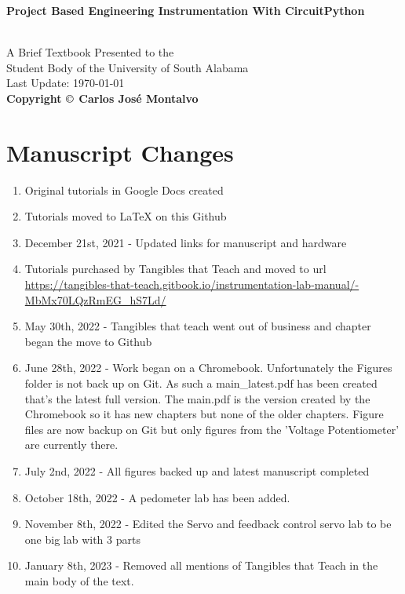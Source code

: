 \documentclass{article}
\begin{document}
\begin{center}
\begin{LARGE}{\bf Project Based Engineering Instrumentation With CircuitPython}\end{LARGE}\\
\large
\vspace{22 mm}
   A Brief Textbook Presented to the \\ 
   Student Body of the University of South Alabama \\
\vspace{22 mm}
\vspace{22 mm}
\vspace{22 mm}
       Last Update: \today\\
{\bf Copyright $\copyright$ Carlos Jos\'{e} Montalvo}
\end{center}

\linespread{1}

\newpage

\section*{Manuscript Changes}

\begin{enumerate}[itemsep=-5pt]
\item Original tutorials in Google Docs created
\item Tutorials moved to LaTeX on this Github
\item December 21st, 2021 - Updated links for manuscript and hardware
\item Tutorials purchased by Tangibles that Teach and moved to url \url{https://tangibles-that-teach.gitbook.io/instrumentation-lab-manual/-MbMx70LQzRmEG_hS7Ld/}
\item May 30th, 2022 - Tangibles that teach went out of business and
  chapter began the move to Github
\item June 28th, 2022 - Work began on a Chromebook. Unfortunately the
  Figures folder is not back up on Git. As such a main\_latest.pdf has
  been created that's the latest full version. The main.pdf is the
  version created by the Chromebook so it has new chapters but none of
  the older chapters. Figure files are now backup on Git but only
  figures from the 'Voltage Potentiometer' are currently there.
\item July 2nd, 2022 - All figures backed up and latest manuscript completed
\item October 18th, 2022 - A pedometer lab has been added.
\item November 8th, 2022 - Edited the Servo and feedback control servo
  lab to be one big lab with 3 parts
\item January 8th, 2023 - Removed all mentions of Tangibles that Teach
  in the main body of the text. 
\end{enumerate}
\end{document}

